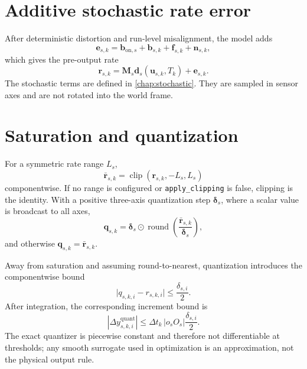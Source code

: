 \documentclass[11pt,oneside,headings=big]{scrreprt}
\newcommand{\clip}{\operatorname{clip}}
\newcommand{\round}{\operatorname{round}}
\newcommand{\Had}{\odot}
\newcommand{\vect}[1]{\bm{#1}}
\newcommand{\mat}[1]{\bm{#1}}
\newcommand{\field}[1]{\texttt{#1}}
\begin{document}
    \section{Additive stochastic rate error}
    After deterministic distortion and run-level misalignment, the model adds
    \begin{equation}
        \vect e_{s,k}
        =\vect b_{\mathrm{on},s}
        +\vect b_{s,k}
        +\vect f_{s,k}
        +\vect n_{s,k},
        \label{eq:additive-error}
    \end{equation}
    which gives the pre-output rate
    \begin{equation}
        \vect r_{s,k}
        =\mat M_s\vect d_s(\vect u_{s,k},T_k)+\vect e_{s,k}.
        \label{eq:pre-output-rate}
    \end{equation}
    The stochastic terms are defined in \cref{chap:stochastic}. They are sampled in
    sensor axes and are not rotated into the world frame.


    \section{Saturation and quantization}
    For a symmetric rate range \(L_s\),
    \begin{equation}
        \bar{\vect r}_{s,k}
        =\clip(\vect r_{s,k},-L_s,L_s)
        \label{eq:clip}
    \end{equation}
    componentwise. If no range is configured or \field{apply\_clipping} is false,
    clipping is the identity. With a
    positive three-axis quantization step \(\vect\delta_s\), where a
    scalar value is broadcast to all axes,
    \begin{equation}
        \vect q_{s,k}
        =\vect\delta_s\Had\round\!\left(\frac{\bar{\vect r}_{s,k}}{\vect\delta_s}\right),
        \label{eq:quantization}
    \end{equation}
    and otherwise \(\vect q_{s,k}=\bar{\vect r}_{s,k}\).

    Away from saturation and assuming round-to-nearest, quantization introduces the
    componentwise bound
    \begin{equation}
        \lvert q_{s,k,i}-r_{s,k,i}\rvert\le\frac{\delta_{s,i}}{2}.
        \label{eq:quant-bound}
    \end{equation}
    After integration, the corresponding increment bound is
    \begin{equation}
        \left\lvert\Delta y^{\mathrm{quant}}_{s,k,i}\right\rvert
        \le \Delta t_k\,\lvert o_sO_s\rvert\frac{\delta_{s,i}}{2}.
    \end{equation}
    The exact quantizer is piecewise constant and therefore not differentiable at
    thresholds; any smooth surrogate used in optimization is an approximation, not
    the physical output rule.
\end{document}
